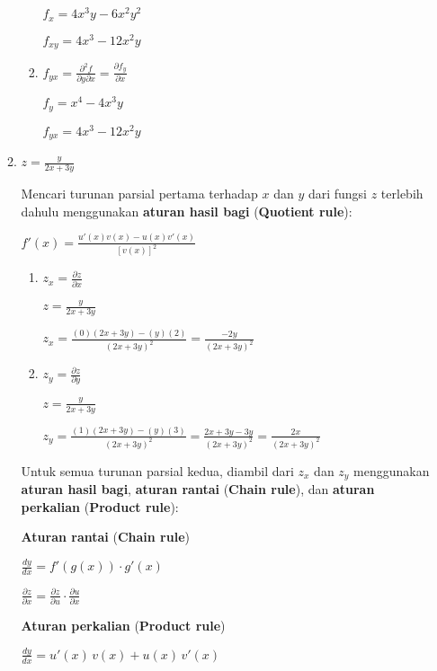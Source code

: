 \documentclass[a4paper]{article}
\begin{document}
\begin{enumerate}[itemsep=1em,leftmargin=*]
\begin{enumerate}[itemsep=1em]
\begin{enumerate}[itemsep=1em,leftmargin=*]
        \(f_x = 4x^3y - 6x^2y^2\)

        \(f_{xy} = 4x^3 - 12x^2y\)

        \item \(f_{yx} = \frac{\partial^2 f}{\partial y \partial x} = \frac{\partial f_y}{\partial x}\)

        \(f_y = x^4 - 4x^3y\)

        \(f_{yx} = 4x^3 - 12x^2y\)
    \end{enumerate}

    \item \(z = \frac{y}{2x+3y}\)

    Mencari turunan parsial pertama terhadap \(x\) dan \(y\) dari fungsi \(z\) terlebih dahulu menggunakan \textbf{aturan hasil bagi} (\textbf{Quotient rule}):

    \(f'(x) = \frac{u'(x)v(x) - u(x)v'(x)}{[v(x)]^2}\)

    \begin{enumerate}[itemsep=1em,leftmargin=*]
        \item \(z_x = \frac{\partial z}{\partial x}\)

        \(z = \frac{y}{2x+3y}\)

        \(z_x = \frac{(0)(2x+3y) - (y)(2)}{(2x+3y)^2} = \frac{-2y}{(2x+3y)^2}\)

        \item \(z_y = \frac{\partial z}{\partial y}\)

        \(z = \frac{y}{2x+3y}\)

        \(z_y = \frac{(1)(2x+3y) - (y)(3)}{(2x+3y)^2} = \frac{2x + 3y - 3y}{(2x+3y)^2} = \frac{2x}{(2x+3y)^2}\)
    \end{enumerate}

    Untuk semua turunan parsial kedua, diambil dari \(z_x\) dan \(z_y\) menggunakan \textbf{aturan hasil bagi}, \textbf{aturan rantai} (\textbf{Chain rule}), dan \textbf{aturan perkalian} (\textbf{Product rule}):

    \vspace{1em}

    \textbf{Aturan rantai} (\textbf{Chain rule})
    
    \(\frac{dy}{dx} = f'(g(x)) \cdot g'(x)\)

    \(\frac{\partial z}{\partial x} = \frac{\partial z}{\partial u} \cdot \frac{\partial u}{\partial x}\)

    \textbf{Aturan perkalian} (\textbf{Product rule})
    
    \(\frac{dy}{dx} = u'(x)\,v(x) + u(x)\,v'(x)\)


\end{enumerate}
\end{enumerate}
\end{document}
